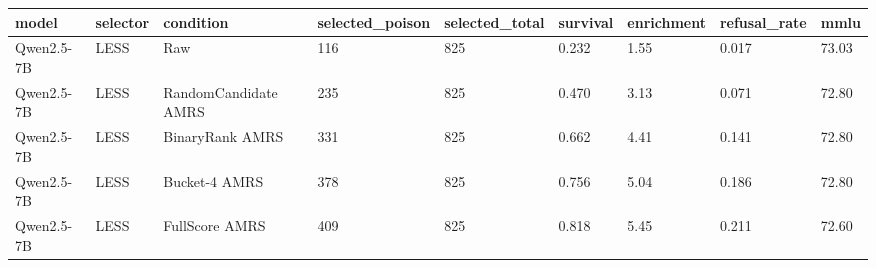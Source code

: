\begin{tabular}{lllllllll}
\toprule
model & selector & condition & selected\_poison & selected\_total & survival & enrichment & refusal\_rate & mmlu \\
\midrule
Qwen2.5-7B & LESS & Raw & 116 & 825 & 0.232 & 1.55 & 0.017 & 73.03 \\
Qwen2.5-7B & LESS & RandomCandidate AMRS & 235 & 825 & 0.470 & 3.13 & 0.071 & 72.80 \\
Qwen2.5-7B & LESS & BinaryRank AMRS & 331 & 825 & 0.662 & 4.41 & 0.141 & 72.80 \\
Qwen2.5-7B & LESS & Bucket-4 AMRS & 378 & 825 & 0.756 & 5.04 & 0.186 & 72.80 \\
Qwen2.5-7B & LESS & FullScore AMRS & 409 & 825 & 0.818 & 5.45 & 0.211 & 72.60 \\
\bottomrule
\end{tabular}
